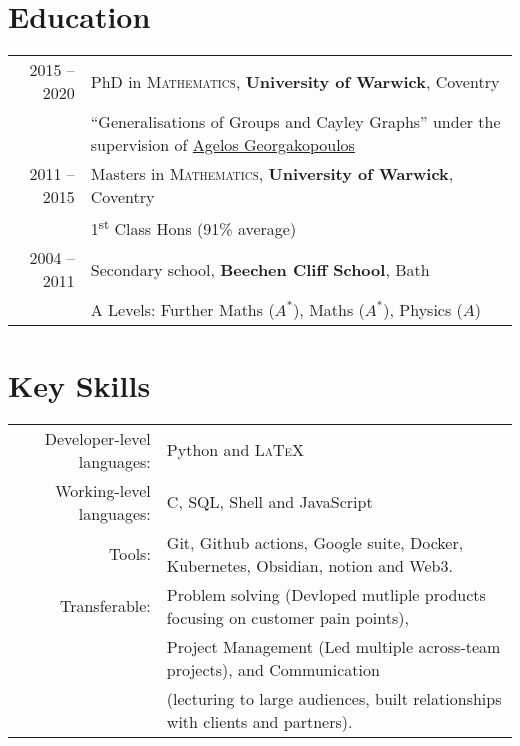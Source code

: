 \documentclass[a4paper,10pt]{article}
\begin{document}
\vspace{-0.5cm}
\section{Education}
\begin{tabular}{rl}
	\textsc{} 2015 -- 2020 & PhD in \textsc{Mathematics}, \textbf{University of Warwick}, Coventry\\
	& ``Generalisations of Groups and Cayley Graphs'' under the supervision of \href{https://homepages.warwick.ac.uk/~maslar/}{Agelos Georgakopoulos}\\
	\textsc{} 2011 -- 2015& Masters in \textsc{Mathematics}, \textbf{University of Warwick}, Coventry\\
	& 1\textsuperscript{st} Class Hons (91\% average)\\
	\textsc{} 2004 -- 2011& Secondary school, \textbf{Beechen Cliff School}, Bath\\
	&  A Levels: Further Maths ($A^{\ast}$), Maths ($A^{\ast}$), Physics ($A$)
\end{tabular}

\vspace{-0.05 in}

\section{Key Skills}
\begin{tabular}{rl}
	Developer-level languages: &  Python and \textsc{LaTeX}\\
	Working-level languages: & C, SQL, Shell and JavaScript\\
	Tools: & Git, Github actions, Google suite, Docker, Kubernetes, Obsidian, notion and Web3.\\
	Transferable: & Problem solving (Devloped mutliple products focusing on customer pain points),\\
	& Project Management (Led multiple across-team projects), and Communication\\
	& (lecturing to large audiences, built relationships with clients and partners).\\
\end{tabular}
\vspace{-0.05 in}
\end{document}
